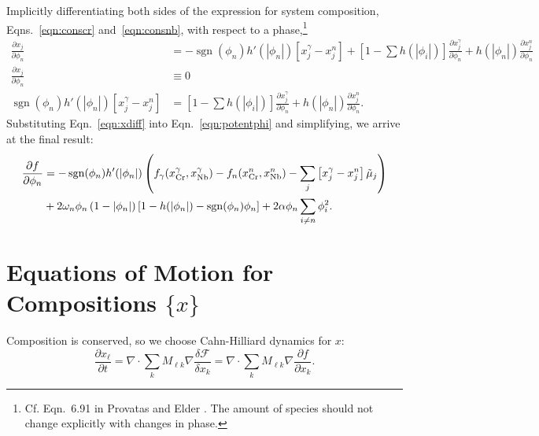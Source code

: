 \documentclass[10pt]{article}
\DeclareMathOperator{\sgn}{sgn}
\begin{document}
		Implicitly differentiating both sides of the expression for system composition,
		Eqns.~\ref{eqn:conscr} and~\ref{eqn:consnb}, with respect to a phase,\footnote{
		Cf. Eqn.~6.91 in Provatas and Elder \cite{Provatas2010}. The amount of species should not change explicitly with changes in phase.
		}
		\begin{align}
			\frac{\partial x_j}{\partial \phi_n} &= -\sgn(\phi_n)h'(|\phi_n|)\left[x_j^{\gamma} - x_j^n\right]
			                                          + \left[1 - \sum h(|\phi_i|)\right] \frac{\partial x_j^{\gamma}}{\partial \phi_n}
			                                          + h(|\phi_n|) \frac{\partial x_j^{n}}{\partial \phi_n}\\
			\frac{\partial x_j}{\partial \phi_n} &\equiv 0\\
			\sgn(\phi_n)h'(|\phi_n|)\left[x_j^{\gamma} - x_j^n\right] &= \left[1 - \sum h(|\phi_i|)\right] \frac{\partial x_j^{\gamma}}{\partial \phi_n}
			                                                           + h(|\phi_n|) \frac{\partial x_j^{n}}{\partial \phi_n}.
			                                                           \label{eqn:xdiff}
		\end{align}
		Substituting Eqn.~\ref{eqn:xdiff} into Eqn.~\ref{eqn:potentphi} and simplifying,
		we arrive at the final result:
		\begin{align}\nonumber
			\frac{\partial f}{\partial \phi_n} &= -\sgn(\phi_n)h'(|\phi_n|)\left(f_{\gamma}(x_{\ce{Cr}}^{\gamma},x_{\ce{Nb}}^{\gamma})
			                                    - f_n(x_{\ce{Cr}}^n,x_{\ce{Nb}}^n) - \sum_j\left[x_j^{\gamma} - x_j^n\right]\tilde{\mu}_j\right)\\
			                                   &+ 2\omega_n\phi_n\left(1-|\phi_n|\right)\left[1 - h(|\phi_n|) - \sgn(\phi_n)\phi_n\right]
			                                    + 2\alpha\phi_n\sum_{i\neq n}\phi_i^2.
			\label{eqn:phieom}
		\end{align}		


	\section{Equations of Motion for Compositions $\{x\}$}
		Composition is conserved, so we choose Cahn-Hilliard dynamics for $x$:
		\begin{equation}
			\frac{\partial x_{\ell}}{\partial t} = \nabla\cdot\sum_k M_{\ell k}\nabla\frac{\delta\mathcal{F}}{\delta x_k}
			                                     = \nabla\cdot\sum_k M_{\ell k}\nabla\frac{\partial f}{\partial x_k}.\label{eqn:fick}
		\end{equation}
		
\end{document}
